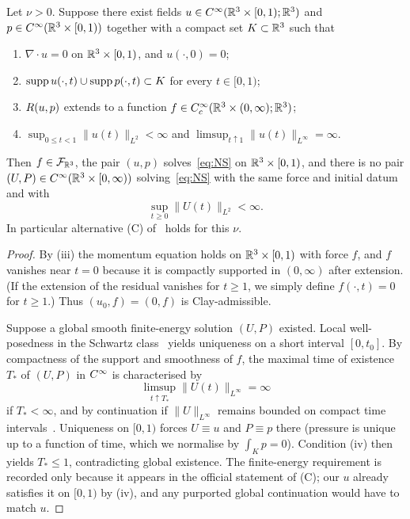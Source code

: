 \begin{lemma}
\label{lem:residual-criterion}
Let $\nu>0$. Suppose there exist fields $u\in C^\infty(\mathbb{R}^3\times[0,1);\mathbb{R}^3)$ and $p\in C^\infty(\mathbb{R}^3\times[0,1))$ together with a compact set $K\subset\mathbb{R}^3$ such that
\begin{enumerate}[label=\textup{(\roman*)}]
\item $\nabla\cdot u=0$ on $\mathbb{R}^3\times[0,1)$, and $u(\cdot,0)=0$;
\item $\operatorname{supp} u(\cdot,t)\cup\operatorname{supp} p(\cdot,t)\subset K$ for every $t\in[0,1)$;
\item $R(u,p)$ extends to a function $f\in C_c^\infty(\mathbb{R}^3\times(0,\infty);\mathbb{R}^3)$;
\item $\displaystyle\sup_{0\le t<1}\|u(t)\|_{L^2}<\infty$ and $\displaystyle\limsup_{t\uparrow 1}\|u(t)\|_{L^\infty}=\infty$.
\end{enumerate}
Then $f\in\mathcal F_{\mathbb{R}^3}$, the pair $(u,p)$ solves~\eqref{eq:NS} on $\mathbb{R}^3\times[0,1)$, and there is no pair $(U,P)\in C^\infty(\mathbb{R}^3\times[0,\infty))$ solving~\eqref{eq:NS} with the same force and initial datum and with
\[
\sup_{t\ge 0}\|U(t)\|_{L^2}<\infty.
\]
In particular alternative \textup{(C)} of~\cite{fefferman2000} holds for this $\nu$.
\end{lemma}

\begin{proof}
By (iii) the momentum equation holds on $\mathbb{R}^3\times[0,1)$ with force $f$, and $f$ vanishes near $t=0$ because it is compactly supported in $(0,\infty)$ after extension. (If the extension of the residual vanishes for $t\ge 1$, we simply define $f(\cdot,t)=0$ for $t\ge 1$.) Thus $(u_0,f)=(0,f)$ is {C}lay-admissible.

Suppose a global smooth finite-energy solution $(U,P)$ existed. Local well-posedness in the Schwartz class~\cite{kato1972,temam2001} yields uniqueness on a short interval $[0,t_0]$. By compactness of the support and smoothness of $f$, the maximal time of existence $T_*$ of $(U,P)$ in $C^\infty$ is characterised by
\[
\limsup_{t\uparrow T_*}\|U(t)\|_{L^\infty}=\infty
\]
if $T_*<\infty$, and by continuation if $\|U\|_{L^\infty}$ remains bounded on compact time intervals~\cite{fefferman2000}. Uniqueness on $[0,1)$ forces $U\equiv u$ and $P\equiv p$ there (pressure is unique up to a function of time, which we normalise by $\int_K p=0$). Condition (iv) then yields $T_*\le 1$, contradicting global existence. The finite-energy requirement is recorded only because it appears in the official statement of (C); our $u$ already satisfies it on $[0,1)$ by (iv), and any purported global continuation would have to match $u$.
\end{proof}

